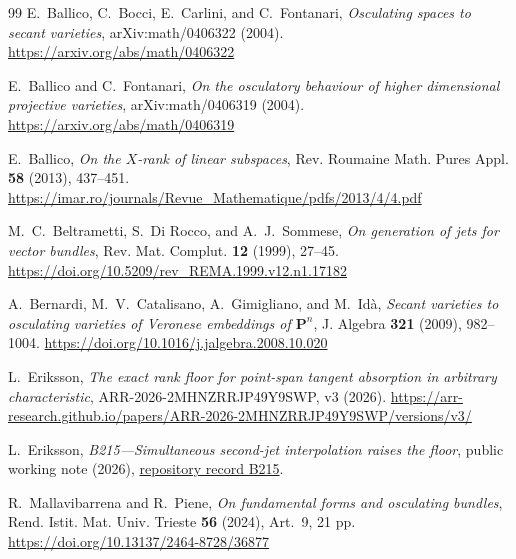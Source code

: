 \documentclass[11pt]{article}
\theoremstyle{definition}
\theoremstyle{remark}
\theoremstyle{plain}
\newcommand{\PP}{\mathbf P}
\begin{document}
{\small
\begin{thebibliography}{99}
E.~Ballico, C.~Bocci, E.~Carlini, and C.~Fontanari,
\emph{Osculating spaces to secant varieties},
arXiv:math/0406322 (2004).
\url{https://arxiv.org/abs/math/0406322}

E.~Ballico and C.~Fontanari,
\emph{On the osculatory behaviour of higher dimensional projective
varieties}, arXiv:math/0406319 (2004).
\url{https://arxiv.org/abs/math/0406319}

E.~Ballico,
\emph{On the $X$-rank of linear subspaces},
Rev. Roumaine Math. Pures Appl. \textbf{58} (2013), 437--451.
\url{https://imar.ro/journals/Revue_Mathematique/pdfs/2013/4/4.pdf}

M.~C.~Beltrametti, S.~Di Rocco, and A.~J.~Sommese,
\emph{On generation of jets for vector bundles},
Rev. Mat. Complut. \textbf{12} (1999), 27--45.
\url{https://doi.org/10.5209/rev_REMA.1999.v12.n1.17182}

A.~Bernardi, M.~V.~Catalisano, A.~Gimigliano, and M.~Id\`a,
\emph{Secant varieties to osculating varieties of Veronese embeddings of
$\PP^n$}, J. Algebra \textbf{321} (2009), 982--1004.
\url{https://doi.org/10.1016/j.jalgebra.2008.10.020}

L.~Eriksson,
\emph{The exact rank floor for point-span tangent absorption in arbitrary
characteristic},
ARR-2026-2MHNZRRJP49Y9SWP, v3 (2026).
\url{https://arr-research.github.io/papers/ARR-2026-2MHNZRRJP49Y9SWP/versions/v3/}

L.~Eriksson,
\emph{B215---Simultaneous second-jet interpolation raises the floor},
public working note (2026),
\href{https://github.com/lluiseriksson/hodge-conjecture-research-front/blob/main/proofs/B215-simultaneous-second-jet-interpolation-floor.md}{repository record B215}.

R.~Mallavibarrena and R.~Piene,
\emph{On fundamental forms and osculating bundles},
Rend. Istit. Mat. Univ. Trieste \textbf{56} (2024), Art.~9, 21 pp.
\url{https://doi.org/10.13137/2464-8728/36877}
\end{thebibliography}
}
\end{document}
